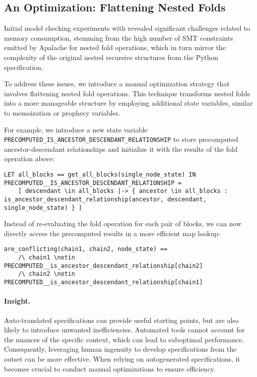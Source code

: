 \subsection{An Optimization: Flattening Nested Folds}

Initial model checking experiments with \SpecTwo{} revealed significant
challenges related to memory consumption, stemming from the high number of SMT
constraints emitted by Apalache for nested fold operations, which in turn mirror
the complexity of the original nested recursive structures from the Python
specification.

To address these issues, we introduce a manual optimization strategy that
involves flattening nested fold operations. This technique transforms nested
folds into a more manageable structure by employing additional \tlap{} state
variables, similar to memoization or prophecy variables.

For example, we introduce a new \tlap{} state variable
\texttt{PRECOMPUTED\_IS\_ANCESTOR\_DESCENDANT\_RELATIONSHIP} to store
precomputed ancestor-descendant relationships and initialize it with the results
of the fold operation above:

\begin{lstlisting}[language=tla]
LET all_blocks == get_all_blocks(single_node_state) IN
PRECOMPUTED__IS_ANCESTOR_DESCENDANT_RELATIONSHIP =
    [ descendant \in all_blocks |-> { ancestor \in all_blocks : is_ancestor_descendant_relationship(ancestor, descendant, single_node_state) } ]
\end{lstlisting}

Instead of re-evaluating the fold operation for each pair of blocks, we can now
directly access the precomputed results in a more efficient map lookup:

\begin{lstlisting}[language=tla]
are_conflicting(chain1, chain2, node_state) ==
    /\ chain1 \notin PRECOMPUTED__is_ancestor_descendant_relationship[chain2]
    /\ chain2 \notin PRECOMPUTED__is_ancestor_descendant_relationship[chain1]
\end{lstlisting}

\paragraph{Insight.} Auto-translated specifications can provide useful starting
points, but are also likely to introduce unwanted inefficiencies. Automated
tools cannot account for the nuances of the specific context, which can lead to
suboptimal performance. Consequently, leveraging human ingenuity to develop
specifications from the outset can be more effective. When relying on
autogenerated specifications, it becomes crucial to conduct manual optimizations
to ensure efficiency.
